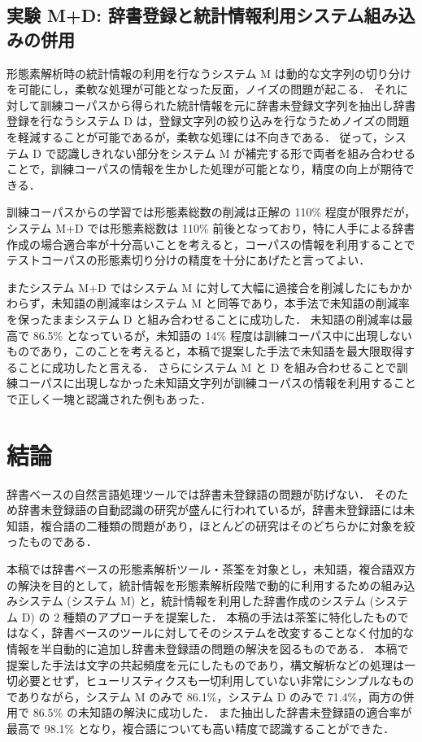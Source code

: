 \subsection{実験 M+D: 辞書登録と統計情報利用システム組み込みの併用}
形態素解析時の統計情報の利用を行なうシステム M は動的な文字列の切り分けを可能にし，柔軟な処理が可能となった反面，ノイズの問題が起こる．
それに対して訓練コーパスから得られた統計情報を元に辞書未登録文字列を抽出し辞書登録を行なうシステム D は，登録文字列の絞り込みを行なうためノイズの問題を軽減することが可能であるが，柔軟な処理には不向きである．
従って，システム D で認識しきれない部分をシステム M が補完する形で両者を組み合わせることで，訓練コーパスの情報を生かした処理が可能となり，精度の向上が期待できる．

訓練コーパスからの学習では形態素総数の削減は正解の 110\% 程度が限界だが，システム M+D では形態素総数は 110\% 前後となっており，特に人手による辞書作成の場合適合率が十分高いことを考えると，コーパスの情報を利用することでテストコーパスの形態素切り分けの精度を十分にあげたと言ってよい．

またシステム M+D ではシステム M に対して大幅に過接合を削減したにもかかわらず，未知語の削減率はシステム M と同等であり，本手法で未知語の削減率を保ったままシステム D と組み合わせることに成功した．
未知語の削減率は最高で 86.5\% となっているが，未知語の 14\% 程度は訓練コーパス中に出現しないものであり，このことを考えると，本稿で提案した手法で未知語を最大限取得することに成功したと言える．
さらにシステム M と D を組み合わせることで訓練コーパスに出現しなかった未知語文字列が訓練コーパスの情報を利用することで正しく一塊と認識された例もあった．
\section{結論}
辞書ベースの自然言語処理ツールでは辞書未登録語の問題が防げない．
そのため辞書未登録語の自動認識の研究が盛んに行われているが，辞書未登録語には未知語，複合語の二種類の問題があり，ほとんどの研究はそのどちらかに対象を絞ったものである．

本稿では辞書ベースの形態素解析ツール・茶筌を対象とし，未知語，複合語双方の解決を目的として，統計情報を形態素解析段階で動的に利用するための組み込みシステム (システム M) と，統計情報を利用した辞書作成のシステム (システム D) の 2 種類のアプローチを提案した．
本稿の手法は茶筌に特化したものではなく，辞書ベースのツールに対してそのシステムを改変することなく付加的な情報を半自動的に追加し辞書未登録語の問題の解決を図るものである．
本稿で提案した手法は文字の共起頻度を元にしたものであり，構文解析などの処理は一切必要とせず，ヒューリスティクスも一切利用していない非常にシンプルなものでありながら，システム M のみで 86.1\%，システム D のみで 71.4\%，両方の併用で 86.5\% の未知語の解決に成功した．
また抽出した辞書未登録語の適合率が最高で 98.1\% となり，複合語についても高い精度で認識することができた．

